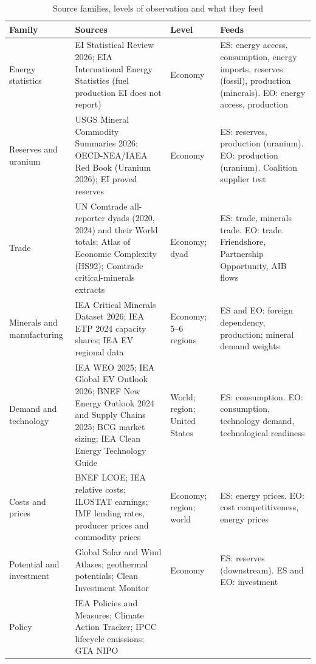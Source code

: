 \begin{table}[tbp]
\centering
\begin{threeparttable}
\caption{Source families, levels of observation and what they feed}
\label{tab:data_families}
\footnotesize
\begin{tabularx}{\textwidth}{@{}>{\raggedright\arraybackslash}p{2.3cm}
  >{\raggedright\arraybackslash}X >{\raggedright\arraybackslash}p{2.0cm}
  >{\raggedright\arraybackslash}p{4.2cm}@{}}
\toprule
Family & Sources & Level & Feeds\\
\midrule
Energy statistics & EI Statistical Review 2026; EIA International Energy Statistics (fuel
  production EI does not report) & Economy & ES: energy access, consumption, energy imports,
  reserves (fossil), production (minerals). EO: energy access, production\\[2pt]
Reserves and uranium & USGS Mineral Commodity Summaries 2026; OECD-NEA/IAEA Red Book (Uranium
  2026); EI proved reserves & Economy & ES: reserves, production (uranium). EO: production
  (uranium). Coalition supplier test\\[2pt]
Trade & UN Comtrade all-reporter dyads (2020, 2024) and their World totals; Atlas of Economic
  Complexity (HS92); Comtrade critical-minerals extracts & Economy; dyad & ES: trade, minerals
  trade. EO: trade. Friendshore, Partnership Opportunity, AIB flows\\[2pt]
Minerals and manufacturing & IEA Critical Minerals Dataset 2026; IEA ETP 2024 capacity shares;
  IEA EV regional data & Economy; 5--6 regions & ES and EO: foreign dependency, production;
  mineral demand weights\\[2pt]
Demand and technology & IEA WEO 2025; IEA Global EV Outlook 2026; BNEF New Energy Outlook 2024
  and Supply Chains 2025; BCG market sizing; IEA Clean Energy Technology Guide & World; region;
  United States & ES: consumption. EO: consumption, technology demand, technological
  readiness\\[2pt]
Costs and prices & BNEF LCOE; IEA relative costs; ILOSTAT earnings; IMF lending rates, producer
  prices and commodity prices & Economy; region; world & ES: energy prices. EO: cost
  competitiveness, energy prices\\[2pt]
Potential and investment & Global Solar and Wind Atlases; geothermal potentials; Clean
  Investment Monitor & Economy & ES: reserves (downstream). ES and EO: investment\\[2pt]
Policy & IEA Policies and Measures; Climate Action Tracker; IPCC lifecycle emissions; GTA NIPO

\end{tabularx}
\end{threeparttable}
\end{table}
